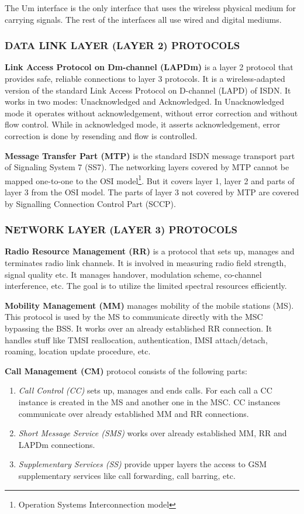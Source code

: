 The Um interface is the only interface that uses the wireless physical medium for carrying signals. The rest of the interfaces all use wired and digital mediums.

\subsubsection{\uppercase{Data Link Layer (Layer 2) protocols}}

\textbf{Link Access Protocol on Dm-channel (LAPDm)} is a layer 2 protocol that provides safe, reliable connections to layer 3 protocols. It is a wireless-adapted version of 
 the standard Link Access Protocol on D-channel (LAPD) of ISDN. It works in two modes: Unacknowledged and Acknowledged. In Unacknowledged mode it operates without acknowledgement,
 without error correction and without flow control. While in acknowledged mode, it asserts acknowledgement, error correction is done by resending and flow is controlled.
 
 
 \textbf{Message Transfer Part (MTP)} is the standard ISDN message transport part of Signaling System 7 (SS7). The networking layers covered by MTP cannot be mapped
 one-to-one to the OSI model\footnote{Operation Systems Interconnection model}. But it covers layer 1, layer 2 and parts of layer 3 from the OSI model. The parts of layer 3
 not covered by MTP are covered by Signalling Connection Control Part (SCCP).

\subsubsection{\uppercase{Network Layer (Layer 3) protocols}}

\textbf{Radio Resource Management (RR)} is a protocol that sets up, manages and terminates
 radio link channels. It is involved in measuring radio field strength, signal quality etc.
 It manages handover, modulation scheme, co-channel interference, etc. The goal is to 
 utilize the limited spectral resources efficiently.
 

\textbf{Mobility Management (MM)} manages mobility of the mobile stations (MS). This
 protocol is used by the MS to communicate directly with the MSC bypassing the BSS. It works over an already established
 RR connection. It handles stuff like TMSI reallocation, authentication, IMSI attach/detach, roaming, location update procedure, etc.
 
 
 \textbf{Call Management (CM)} protocol consists of the following parts:
 \begin{enumerate}
  \item \textit{Call Control (CC)} sets up, manages and ends calls. For each call a CC instance is created in the MS and another one in the MSC. CC instances 
  communicate over already established MM and RR connections.
  \item \textit{Short Message Service (SMS)} works over already established MM, RR and LAPDm connections.
  \item \textit{Supplementary Services (SS)} provide upper layers the access to GSM supplementary services like call forwarding, call barring, etc. 
 \end{enumerate}


